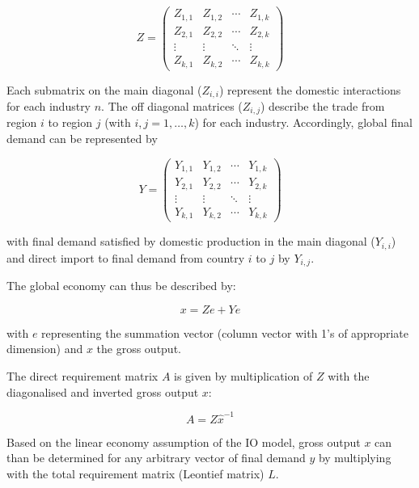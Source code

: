 \documentclass{jors}
\begin{document}
{\begin{equation}
    Z =
    \begin{pmatrix}
      Z_{1,1} & Z_{1,2} & \cdots & Z_{1,k} \\
      Z_{2,1} & Z_{2,2} & \cdots & Z_{2,k} \\
      \vdots  & \vdots  & \ddots & \vdots  \\
      Z_{k,1} & Z_{k,2} & \cdots & Z_{k,k}
    \end{pmatrix}
\end{equation}

Each submatrix on the main diagonal ($Z_{i,i}$) represent the domestic
interactions for each industry $n$. The off diagonal matrices ($Z_{i,j}$)
describe the trade from region $i$ to region $j$ (with $i, j = 1, \ldots, k$)
for each industry. Accordingly, global final demand can be represented by

\begin{equation}
    Y =
    \begin{pmatrix}
      Y_{1,1} & Y_{1,2} & \cdots & Y_{1,k} \\
      Y_{2,1} & Y_{2,2} & \cdots & Y_{2,k} \\
      \vdots  & \vdots  & \ddots & \vdots  \\
      Y_{k,1} & Y_{k,2} & \cdots & Y_{k,k}
    \end{pmatrix}
\end{equation}

with final demand satisfied by domestic production in the main diagonal
($Y_{i,i}$) and direct import to final demand from country $i$ to $j$ by
$Y_{i,j}$.

The global economy can thus be described by:

\begin{equation}
    x = Ze + Ye
\end{equation}

with $e$ representing the summation vector (column vector with 1's of
appropriate dimension) and $x$ the gross output.

The direct requirement matrix $A$ is given by multiplication of $Z$ with the
diagonalised and inverted gross output $x$:

\begin{equation}
    A = Z\hat{x}^{-1}
\end{equation}

Based on the linear economy assumption of the IO model, gross output $x$ can than be determined for any arbitrary vector of final demand $y$ by multiplying with the total requirement matrix (Leontief matrix) $L$.

}
\end{document}
